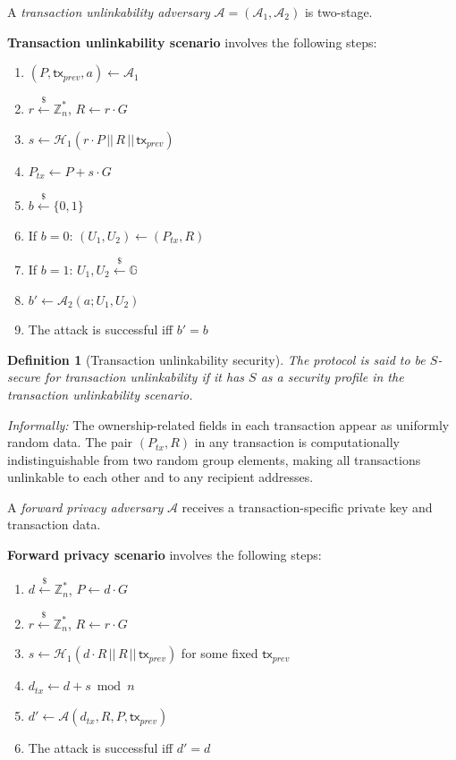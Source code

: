 \documentclass{article}
\newtheorem{definition}{Definition}[section]
\begin{document}
A \emph{transaction unlinkability adversary} $\mathcal{A} = (\mathcal{A}_1, \mathcal{A}_2)$ is two-stage. \medskip

\noindent\textbf{Transaction unlinkability scenario} involves the following steps:
\begin{enumerate}
\item $(P, \mathsf{tx}_{prev}, a) \gets \mathcal{A}_1$
\item $r \stackrel{\$}{\leftarrow} \mathbb{Z}_n^*$, $R \leftarrow r \cdot G$
\item $s \leftarrow \mathcal{H}_1(r \cdot P \,||\, R \,||\, \mathsf{tx}_{prev})$
\item $P_{tx} \leftarrow P + s \cdot G$
\item $b \stackrel{\$}{\leftarrow} \{0,1\}$
\item If $b = 0$: $(U_1, U_2) \leftarrow (P_{tx}, R)$
\item If $b = 1$: $U_1, U_2 \stackrel{\$}{\leftarrow} \mathbb{G}$
\item $b' \gets \mathcal{A}_2(a; U_1, U_2)$
\item The attack is successful iff $b' = b$
\end{enumerate}

\begin{definition}[Transaction unlinkability security]
The protocol is said to be $S$-secure for transaction unlinkability if it has $S$ as a security profile in the transaction unlinkability scenario.
\end{definition}

\textit{Informally:} The ownership-related fields in each transaction appear as uniformly random data. The pair $(P_{tx}, R)$ in any transaction is computationally indistinguishable from two random group elements, making all transactions unlinkable to each other and to any recipient addresses.

\medskip

\noindent A \emph{forward privacy adversary} $\mathcal{A}$ receives a transaction-specific private key and transaction data. \medskip

\noindent\textbf{Forward privacy scenario} involves the following steps:
\begin{enumerate}
\item $d \stackrel{\$}{\leftarrow} \mathbb{Z}_n^*$, $P \leftarrow d \cdot G$
\item $r \stackrel{\$}{\leftarrow} \mathbb{Z}_n^*$, $R \leftarrow r \cdot G$
\item $s \leftarrow \mathcal{H}_1(d \cdot R \,||\, R \,||\, \mathsf{tx}_{prev})$ for some fixed $\mathsf{tx}_{prev}$
\item $d_{tx} \leftarrow d + s \bmod n$
\item $d' \gets \mathcal{A}(d_{tx}, R, P, \mathsf{tx}_{prev})$
\item The attack is successful iff $d' = d$
\end{enumerate}
\end{document}
